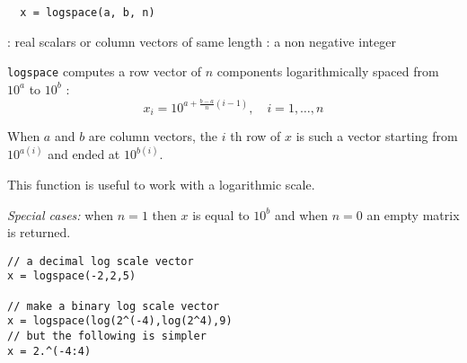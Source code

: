 \begin{mandesc}
\end{mandesc}
\begin{calling_sequence}
\begin{verbatim}
  x = logspace(a, b, n)
\end{verbatim}
\end{calling_sequence}

\begin{parameters}
  \begin{varlist}
    : real scalars or column vectors of same length
    : a non negative integer
  \end{varlist}
\end{parameters}
\begin{mandescription}
  \verb+logspace+ computes a row vector of $n$ components logarithmically spaced from $10^a$ to $10^b$ :
$$
    x_i = 10^{a + \frac{b-a}{n} (i-1)}, \quad i = 1, \dots, n
$$

   When $a$ and $b$ are column vectors, the $i$ th row of $x$ is such a vector starting from $10^{a(i)}$ and ended
  at $10^{b(i)}$.

   This function is useful to work with a logarithmic scale.

  {\em Special cases: } when $n=1$ then $x$ is equal to $10^b$ and when $n=0$ an empty matrix is returned.
\end{mandescription}

\begin{examples}
\begin{Verbatim}
// a decimal log scale vector
x = logspace(-2,2,5)

// make a binary log scale vector
x = logspace(log(2^(-4),log(2^4),9)
// but the following is simpler
x = 2.^(-4:4)
\end{Verbatim}

\end{examples}

\begin{manseealso}
\end{manseealso}

